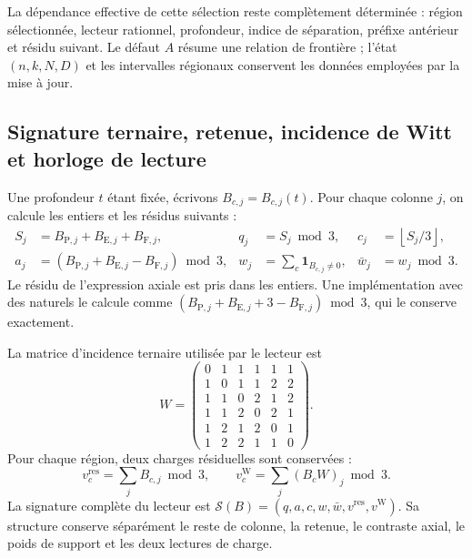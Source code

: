 La dépendance effective de cette sélection reste complètement déterminée :
région sélectionnée, lecteur rationnel, profondeur, indice de séparation,
préfixe antérieur et résidu suivant. Le défaut \(A\) résume une relation
de frontière ; l'état \((n,k,N,D)\) et les intervalles régionaux conservent
les données employées par la mise à jour.

\subsection{Signature ternaire, retenue, incidence de Witt et horloge de lecture}
\label{subsec:df-firma-conjunta}


Une profondeur \(t\) étant fixée, écrivons \(B_{c,j}=B_{c,j}(t)\). Pour chaque colonne \(j\), on calcule les entiers et les résidus suivants :
\begin{align}
 S_j&=B_{\mathrm P,j}+B_{\mathrm E,j}+B_{\mathrm F,j},
 &q_j&=S_j\bmod3,
 &c_j&=\left\lfloor S_j/3\right\rfloor,
 \label{eq:df-firma-qc}\\
 a_j&=(B_{\mathrm P,j}+B_{\mathrm E,j}-B_{\mathrm F,j})\bmod3,
 &w_j&=\sum_c\mathbf1_{B_{c,j}\ne0},
 &\bar w_j&=w_j\bmod3.
 \label{eq:df-firma-axial}
\end{align}
Le résidu de l'expression axiale est pris dans les entiers. Une implémentation
avec des naturels le calcule comme
\((B_{\mathrm P,j}+B_{\mathrm E,j}+3-B_{\mathrm F,j})\bmod3\), qui le conserve
exactement.

La matrice d'incidence ternaire utilisée par le lecteur est
\begin{equation}
 W=\begin{pmatrix}
0&1&1&1&1&1\\
1&0&1&1&2&2\\
1&1&0&2&1&2\\
1&1&2&0&2&1\\
1&2&1&2&0&1\\
1&2&2&1&1&0
\end{pmatrix}.
\label{eq:df-matriz-witt}
\end{equation}
Pour chaque région, deux charges résiduelles sont conservées :
\begin{equation}
 v_c^{\mathrm{res}}=\sum_j B_{c,j}\bmod3,
 \qquad
 v_c^{\mathrm W}=\sum_j(B_cW)_j\bmod3.
 \label{eq:df-cargas-residuales}
\end{equation}
La signature complète du lecteur est
\(\mathcal S(B)=(q,a,c,w,\bar w,v^{\mathrm{res}},v^{\mathrm W})\).
Sa structure conserve séparément le reste de colonne, la retenue, le
contraste axial, le poids de support et les deux lectures de charge.

